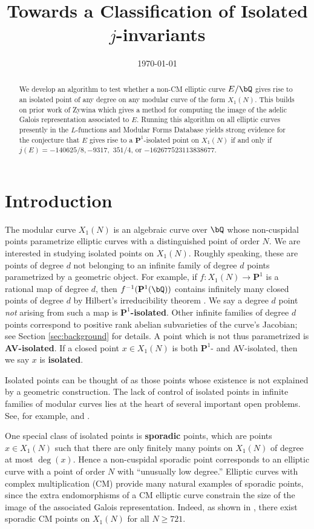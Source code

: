 \documentclass[11pt,reqno]{amsart}
\title{Towards a Classification of Isolated $j$-invariants}
\date{\today}
\theoremstyle{plain}
\theoremstyle{definition}
\newcommand{\Q}{\bQ}
\newcommand{\PP}{\mathbf P}
\newcommand{\dldedit}[1]{{\color{Plum} #1}}
\begin{document}
\begin{abstract}
We develop an algorithm to test whether a non-CM elliptic curve $E/\Q$ gives rise to an isolated point of any degree on any modular curve of the form $X_1(N)$. This builds on prior work of Zywina which gives a method for computing the image of the adelic Galois representation associated to $E$. Running this algorithm on all elliptic curves presently in the $L$-functions and Modular Forms Database yields strong evidence for the conjecture that $E$ gives rise to a $\PP^1$-isolated point on $X_1(N)$ if and only if $j(E)=-140625/8, -9317,$ $351/4$, or $-162677523113838677$.
\end{abstract}

\maketitle

\section{Introduction}
\label{sec:intro}

The modular curve $X_1(N)$ is an algebraic curve over $\Q$ whose non-cuspidal points parametrize elliptic curves with a distinguished point of order $N$. We are interested in studying isolated points on $X_1(N)$.
Roughly speaking, these are points of degree $d$ not belonging to an infinite family of degree $d$ points parametrized by a geometric object. For example, if $f: X_1(N) \rightarrow \PP^1$ is a rational map of degree $d$, then $f^{-1}(\PP^1(\Q))$ contains infinitely many closed points of degree $d$ by Hilbert's irreducibility theorem \cite[Chapter~9]{serre97}. We say a degree $d$ point \emph{not} arising from such a map is \textbf{$\PP^1$-isolated}. Other infinite families of degree $d$ points correspond to positive rank abelian subvarieties of the curve's Jacobian; see Section \ref{sec:background} for details. A point which is not thus parametrized is \textbf{AV-isolated}. If a closed point $x\in X_1(N)$ is both $\PP^1$- and AV-isolated, then we say $x$ is \textbf{isolated}.

Isolated points can be thought of as those points whose existence is not explained by a geometric construction. The lack of control of isolated points in infinite families of modular curves lies at the heart of several important open problems. See, for example, \cite[Question~1]{MazurNote} and \cite[Theorem~1.3]{BourdonNajman2021}.

One special class of isolated points is \textbf{sporadic} points, which are
points $x \in X_1(N)$ such that there are only finitely many points on $X_1(N)$
of degree at most $\deg(x)$. Hence a non-cuspidal sporadic point corresponds to
an elliptic curve with a point of order $N$ \dldedit{with ``unusually low degree.''}
Elliptic curves with complex multiplication (CM) provide many natural examples
of sporadic points, since the extra endomorphisms of a CM elliptic curve
constrain the size of the image of the associated Galois representation.
Indeed, as shown in \cite[Theorem~8.2]{CGPS2022}, there exist sporadic CM
points on $X_1(N)$ for all $N\geq 721$.
\end{document}
